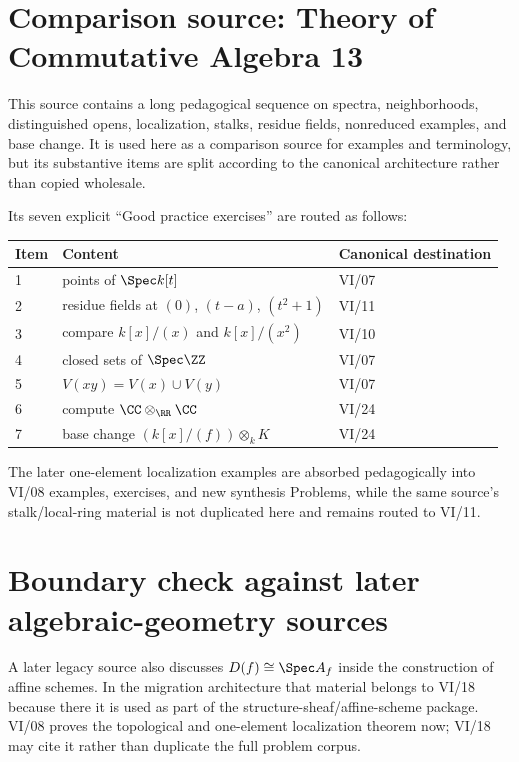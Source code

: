 \section*{Comparison source: Theory of Commutative Algebra 13}
This source contains a long pedagogical sequence on spectra, neighborhoods, distinguished
opens, localization, stalks, residue fields, nonreduced examples, and base change.  It is
used here as a comparison source for examples and terminology, but its substantive items are
split according to the canonical architecture rather than copied wholesale.

Its seven explicit ``Good practice exercises'' are routed as follows:
\begin{center}
\renewcommand{\arraystretch}{1.18}
\begin{tabular}{p{}p{}p{}}
\toprule
\textbf{Item} & \textbf{Content} & \textbf{Canonical destination}\\
\midrule
1 & points of $\Spec k[t]$ & VI/07\\
2 & residue fields at $(0)$, $(t-a)$, $(t^2+1)$ & VI/11\\
3 & compare $k[x]/(x)$ and $k[x]/(x^2)$ & VI/10\\
4 & closed sets of $\Spec\ZZ$ & VI/07\\
5 & $V(xy)=V(x)\cup V(y)$ & VI/07\\
6 & compute $\CC\otimes_\RR\CC$ & VI/24\\
7 & base change $(k[x]/(f))\otimes_kK$ & VI/24\\
\bottomrule
\end{tabular}
\end{center}

The later one-element localization examples are absorbed pedagogically into VI/08 examples,
exercises, and new synthesis Problems, while the same source's stalk/local-ring material is
not duplicated here and remains routed to VI/11.

\section*{Boundary check against later algebraic-geometry sources}
A later legacy source also discusses $D(f)\cong\Spec A_f$ inside the construction of affine
schemes.  In the migration architecture that material belongs to VI/18 because there it is
used as part of the structure-sheaf/affine-scheme package.  VI/08 proves the topological and
one-element localization theorem now; VI/18 may cite it rather than duplicate the full
problem corpus.

